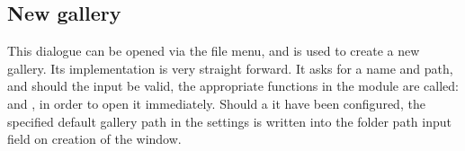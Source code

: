 \subsection{New gallery}

This dialogue can be opened via the file menu, and is used to create a new gallery. Its implementation is very straight forward. It asks for a name and path, and should the input be valid, the appropriate functions in the  module are called:  and , in order to open it immediately. Should a it have been configured, the specified default gallery path in the settings is written into the folder path input field on creation of the window.